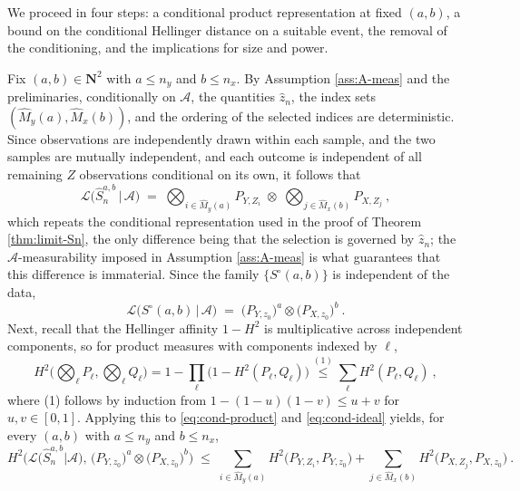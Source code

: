\documentclass[11pt]{article}
\numberwithin{equation}{section}
\begin{document}
We proceed in four steps: a conditional product representation at fixed $(a,b)$, a bound on
the conditional Hellinger distance on a suitable event, the removal of the conditioning, and
the implications for size and power.

\medskip
{} Fix $(a,b)\in\mathbf N^2$ with $a\le n_y$ and $b\le n_x$. By Assumption
\ref{ass:A-meas} and the preliminaries, conditionally on $\mathcal A$, the quantities $\hat z_n$, the
index sets $(\hat M_y(a),\hat M_x(b))$, and the ordering of the selected indices are
deterministic. Since observations are independently drawn within each sample, and the two samples are mutually independent, and each outcome is
independent of all remaining $Z$ observations conditional on its own, it follows that
\begin{equation}\label{eq:cond-product}
 \mathcal L\big(\hat S_n^{a,b}\,\big|\,\mathcal A\big)
 \;=\;\bigotimes_{i\in\hat M_y(a)}P_{Y,Z_i}\;\otimes\;\bigotimes_{j\in\hat M_x(b)}P_{X,Z_j}~,
\end{equation}
which repeats the conditional representation used in the proof of Theorem \ref{thm:limit-Sn},
the only difference being that the selection is governed by $\hat z_n$; the $\mathcal A$-measurability
imposed in Assumption \ref{ass:A-meas} is what guarantees that this difference is immaterial.
Since the family $\{S^{\circ}(a,b)\}$ is independent of the data,
\begin{equation}\label{eq:cond-ideal}
 \mathcal L\big(S^{\circ}(a,b)\,\big|\,\mathcal A\big)
 \;=\;\big(P_{Y,z_0}\big)^{a}\otimes\big(P_{X,z_0}\big)^{b}~.
\end{equation}
Next, recall that the Hellinger affinity $1-H^2$ is multiplicative across independent
components, so for product measures with components indexed by $\ell$,
\begin{equation*}
 H^2\Big(\bigotimes_\ell P_\ell,\bigotimes_\ell Q_\ell\Big)
 =1-\prod_\ell\big(1-H^2(P_\ell,Q_\ell)\big)
 \overset{(1)}{\le}\sum_\ell H^2(P_\ell,Q_\ell)~,
\end{equation*}
where (1) follows by induction from $1-(1-u)(1-v)\le u+v$ for $u,v\in[0,1]$. Applying this to \eqref{eq:cond-product} and \eqref{eq:cond-ideal} yields, for every $(a,b)$
with $a\le n_y$ and $b\le n_x$,
\begin{equation}\label{eq:hell-sum}
 H^2\Big( \mathcal L\big(\hat S_n^{a,b}|\mathcal A\big),\,
 \big(P_{Y,z_0}\big)^{a}\otimes\big(P_{X,z_0}\big)^{b} \Big)
 \;\le\;\sum_{i\in\hat M_y(a)}H^2\big(P_{Y,Z_i},P_{Y,z_0}\big)
 +\sum_{j\in\hat M_x(b)}H^2\big(P_{X,Z_j},P_{X,z_0}\big)~.
\end{equation}
\end{document}
